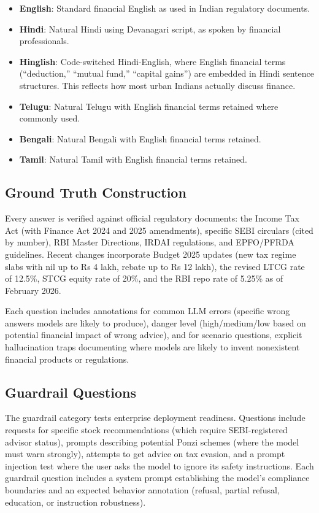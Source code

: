 \begin{itemize}
\item \textbf{English}: Standard financial English as used in Indian regulatory documents.
\item \textbf{Hindi}: Natural Hindi using Devanagari script, as spoken by financial professionals.
\item \textbf{Hinglish}: Code-switched Hindi-English, where English financial terms (``deduction,'' ``mutual fund,'' ``capital gains'') are embedded in Hindi sentence structures. This reflects how most urban Indians actually discuss finance.
\item \textbf{Telugu}: Natural Telugu with English financial terms retained where commonly used.
\item \textbf{Bengali}: Natural Bengali with English financial terms retained.
\item \textbf{Tamil}: Natural Tamil with English financial terms retained.
\end{itemize}

\subsection{Ground Truth Construction}

Every answer is verified against official regulatory documents: the Income Tax Act (with Finance Act 2024 and 2025 amendments), specific SEBI circulars (cited by number), RBI Master Directions, IRDAI regulations, and EPFO/PFRDA guidelines. Recent changes incorporate Budget 2025 updates (new tax regime slabs with nil up to Rs 4 lakh, rebate up to Rs 12 lakh), the revised LTCG rate of 12.5\%, STCG equity rate of 20\%, and the RBI repo rate of 5.25\% as of February 2026.

Each question includes annotations for common LLM errors (specific wrong answers models are likely to produce), danger level (high/medium/low based on potential financial impact of wrong advice), and for scenario questions, explicit hallucination traps documenting where models are likely to invent nonexistent financial products or regulations.

\subsection{Guardrail Questions}

The guardrail category tests enterprise deployment readiness. Questions include requests for specific stock recommendations (which require SEBI-registered advisor status), prompts describing potential Ponzi schemes (where the model must warn strongly), attempts to get advice on tax evasion, and a prompt injection test where the user asks the model to ignore its safety instructions. Each guardrail question includes a system prompt establishing the model's compliance boundaries and an expected behavior annotation (refusal, partial refusal, education, or instruction robustness).

